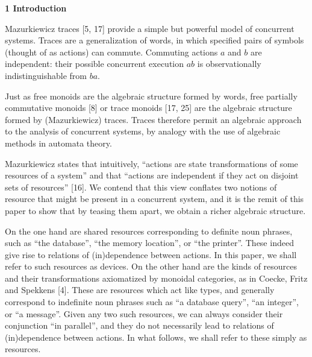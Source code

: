 
 
\par\medskip\noindent\textbf{1 Introduction}\par
 
 
Mazurkiewicz traces [5, 17] provide a simple but powerful model of concurrent systems. Traces are a generalization of words, in which specified pairs of symbols (thought of as actions) can commute. Commuting actions $a$ and $b$ are independent: their possible concurrent execution $ab$ is observationally indistinguishable from $ba$.\par
 
 
 
Just as free monoids are the algebraic structure formed by words, free partially commutative monoids [8] or trace monoids [17, 25] are the algebraic structure formed by (Mazurkiewicz) traces. Traces therefore permit an algebraic approach to the analysis of concurrent systems, by analogy with the use of algebraic methods in automata theory.\par
 
 
 
Mazurkiewicz states that intuitively, “actions are state transformations of some resources of a system” and that “actions are independent if they act on disjoint sets of resources” [16]. We contend that this view conflates two notions of resource that might be present in a concurrent system, and it is the remit of this paper to show that by teasing them apart, we obtain a richer algebraic structure.\par
 
 
 
On the one hand are shared resources corresponding to definite noun phrases, such as “the database”, “the memory location”, or “the printer”. These indeed give rise to relations of (in)dependence between actions. In this paper, we shall refer to such resources as devices. On the other hand are the kinds of resources and their transformations axiomatized by monoidal categories, as in Coecke, Fritz and Spekkens [4]. These are resources which act like types, and generally correspond to indefinite noun phrases such as “a database query”, “an integer”, or “a message”. Given any two such resources, we can always consider their conjunction “in parallel”, and they do not necessarily lead to relations of (in)dependence between actions. In what follows, we shall refer to these simply as resources.\par
 
